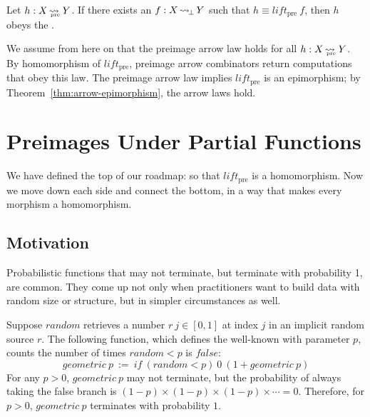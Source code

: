 \documentclass{llncs}
\newcommand{\arrow}{\rightsquigarrow}
\newcommand{\arrowlift}{\ensuremath{lift}}
\DeclareMathOperator{\botto}{\arrow_{\mspace{-3mu}\bot}}
\newcommand{\pre}{_\mathrm{pre}}
\DeclareMathOperator{\preto}{\arrow_{\mspace{-19mu}\pre}}
\newcommand{\liftpre}{\arrowlift\pre}
\begin{document}
\begin{definition}
\label{def:preimage-arrow-law}
Let $h : X \preto Y$. If there exists an $f : X \botto Y$ such that $h \equiv \liftpre~f$, then $h$ obeys the .
\end{definition}

We assume from here on that the preimage arrow law holds for all $h : X \preto Y$.
By homomorphism of $\liftpre$, preimage arrow combinators return computations that obey this law.
The preimage arrow law implies $\liftpre$ is an epimorphism; by Theorem~\ref{thm:arrow-epimorphism}, the arrow laws hold.


\section{Preimages Under Partial Functions}

We have defined the top of our roadmap:
so that $\liftpre$ is a homomorphism.
Now we move down each side and connect the bottom, in a way that makes every morphism a homomorphism.

\subsection{Motivation}

Probabilistic functions that may not terminate, but terminate with probability 1, are common.
They come up not only when practitioners want to build data with random size or structure, but in simpler circumstances as well.

Suppose $random$ retrieves a number $r~j \in [0,1]$ at index $j$ in an implicit random source $r$.
The following function, which defines the well-known  with parameter $p$, counts the number of times $random < p$ is $false$:
\begin{equation}
	geometric~p \ := \ if~(random < p)~0~(1 + geometric~p)
\label{eqn:geometric-def}
\end{equation}
For any $p > 0$, $geometric~p$ may not terminate, but the probability of always taking the false branch is $(1-p) \times (1-p) \times (1-p) \times \cdots = 0$.
Therefore, for $p > 0$, $geometric~p$ terminates with probability $1$.
\end{document}
